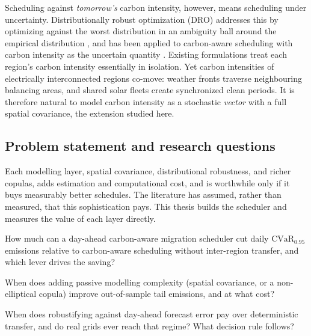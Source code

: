 \documentclass[10pt,twocolumn]{article}
\newcommand{\CVaR}{\mathrm{CVaR}}
\begin{document}
Scheduling against \emph{tomorrow's} carbon intensity, however, means scheduling
under uncertainty. Distributionally robust optimization (DRO) addresses this by
optimizing against the worst distribution in an ambiguity ball around the empirical
distribution \citep{esfahani2018}, and has been applied to carbon-aware scheduling
with carbon intensity as the uncertain quantity \citep{hall2024}. Existing
formulations treat each region's carbon intensity essentially in isolation. Yet
carbon intensities of electrically interconnected regions co-move: weather fronts
traverse neighbouring balancing areas, and shared solar fleets create synchronized
clean periods. It is therefore natural to model carbon intensity as a stochastic
\emph{vector} with a full spatial covariance, the extension studied here.

\subsection{Problem statement and research questions}
Each modelling layer, spatial covariance, distributional robustness, and richer
copulas, adds estimation and computational cost, and is worthwhile only if it buys
measurably better schedules. The literature has assumed, rather than measured, that
this sophistication pays. This thesis builds the scheduler and measures the value of
each layer directly.

\begin{description}[leftmargin=1.4em,itemsep=2pt]
\item[RQ1.] How much can a day-ahead carbon-aware migration scheduler cut daily
$\CVaR_{0.95}$ emissions relative to carbon-aware scheduling without inter-region
transfer, and which lever drives the saving?
\item[RQ2.] When does adding passive modelling complexity (spatial covariance, or a
non-elliptical copula) improve out-of-sample tail emissions, and at what cost?
\item[RQ3.] When does robustifying against day-ahead forecast error pay over
deterministic transfer, and do real grids ever reach that regime? What decision rule
follows?
\end{description}
\end{document}

